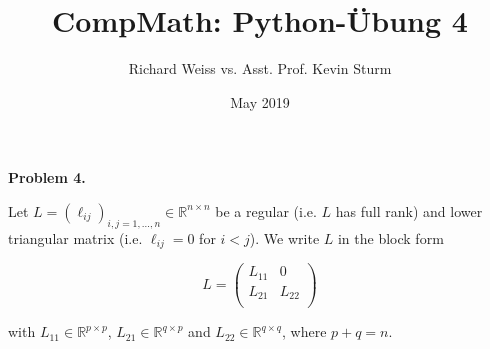 \documentclass{article}
\title{CompMath: Python-Übung 4}
\author{Richard Weiss vs. Asst. Prof. Kevin Sturm}
\date{May 2019}
\begin{document}
\maketitle

\textbf{Problem 4.}

Let $L = (\ell_{ij})_{i, j = 1, \ldots, n} \in \mathbb{R}^{n \times n}$ be a regular (i.e. $L$ has full rank) and lower triangular matrix (i.e. $\ell_{ij} = 0$ for $i < j$). We write $L$ in the block form

\begin{equation*}
    L =
    \begin{pmatrix}
        L_{11} & 0      \\
        L_{21} & L_{22} \\
    \end{pmatrix}
\end{equation*}

with $L_{11} \in \mathbb{R}^{p \times p}$, $L_{21} \in \mathbb{R}^{q \times p}$ and $L_{22} \in \mathbb{R}^{q \times q}$, where $p + q = n$.
\end{document}
